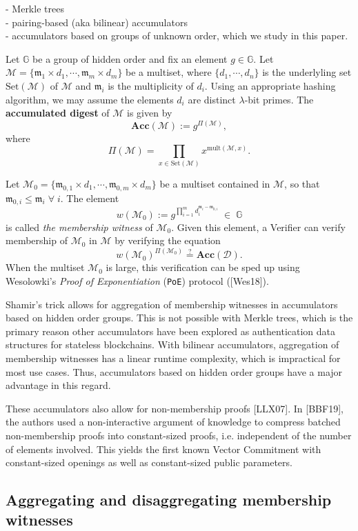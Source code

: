 \documentclass[11pt, lettersize, notitlepage, leqno, footskip=0.6cm]{article}
\newcommand{\pl}{\prod\limits}
\newcommand{\Acc}{\mbf{Acc}}
\newcommand{\sett}{\mr{Set}}
\newcommand{\mult}{\mr{mult}}
\newcommand{\mc}{\mathcal}
\newcommand{\mb}{\mathbb}
\newcommand{\mbf}{\mathbf}
\newcommand{\mr}{\mathrm}
\newcommand{\mfm}{\mathfrak{m}}
\newcommand{\lam}{\lambda}
\newcommand{\vs}{\vspace{-0.15cm}}
\newcommand{\noin}{\noindent}
\newcommand{\sta}{\stackrel{?}{=}}
\numberwithin{equation}{section}
\begin{document}
\noin - Merkle trees\\
- pairing-based (aka bilinear) accumulators \\  
- accumulators based on groups of unknown order, which we study in this paper. 

Let $\mb{G}$ be a group of hidden order and fix an element $g \in\mb{G}$. Let $\mc{M}= \{\mfm_1\times d_1,\cdots, \mfm_m\times d_m\}$ be a multiset, where $\{d_1,\cdots, d_n \}$ is the underlyling set $\sett(\mc{M})$ of $\mc{M}$ and $\mfm_i$ is the multiplicity of $d_i$. Using an appropriate hashing algorithm, we may assume the elements $d_i$ are distinct $\lam$-bit primes. The \textbf{accumulated digest} of $\mc{M}$ is given by \vs $$\Acc(\mc{M}):= g^{\Pi(\mc{M})} ,$$ where $$\Pi(\mc{M}) = \pl_{x\in \sett(\mc{M})} x^{\mult(\mc{M},x)} .$$

 Let $\mc{M}_0 = \{\mfm_{0,1}\times d_1,\cdots, \mfm_{0,m}\times d_m\}$ be a multiset contained in $\mc{M}$, so that  $\mfm_{0,i}\leq \mfm_i\;\forall\;i$. The element \vs $$w(\mc{M}_0):= g^{\pl_{i=1}^m d_i^{\mfm_i - \mfm_{0,i}}}\;\in\;\mb{G} $$ is called \textit{the membership witness} of $\mc{M}_0$. Given this element, a Verifier can verify membership of $\mc{M}_0$ in $\mc{M}$ by verifying the equation \vs $$w(\mc{M}_0)^{\Pi(\mc{M}_0)} \sta \Acc(\mc{D}).$$ When the multiset $\mc{M}_0$ is large, this verification can be sped up using Wesolowki's \textit{Proof of Exponentiation} (\verb|PoE|) protocol ([Wes18]).

Shamir's trick allows for aggregation of membership witnesses in accumulators based on hidden order groups. This is not possible with Merkle trees, which is the primary reason other accumulators have been explored as authentication data structures for stateless blockchains. With bilinear accumulators, aggregation of membership witnesses has a linear runtime complexity, which is impractical for most use cases. Thus, accumulators based on hidden order groups have a major advantage in this regard.

These accumulators also allow for non-membership proofs [LLX07]. In [BBF19], the authors used a non-interactive argument of knowledge to compress batched non-membership proofs into constant-sized proofs, i.e. independent of the number of elements involved. This yields the first known Vector Commitment with constant-sized openings as well as  constant-sized public parameters.


\subsection{\fontsize{11}{11} Aggregating and disaggregating membership witnesses}
\end{document}

